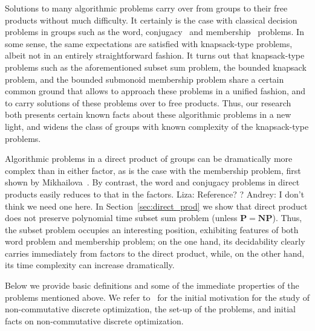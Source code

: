 \documentclass[10pt]{amsart}
\newcommand{\an}{\noindent\color{red} Andrey: }{}
\newcommand{\li}{\noindent\color{blue} Liza: }{}
\theoremstyle{definition}
\def\P{{\mathbf{P}}}
\def\NP{{\mathbf{NP}}}
\begin{document}
Solutions to many algorithmic problems carry over from groups to their free products without much difficulty. It certainly is the case with classical decision problems in groups such as the word, conjugacy~\cite{Lyndon-Schupp:2001} and membership~\cite{Mikhailova_68} problems. In some sense, the same expectations are satisfied with knapsack-type problems, albeit not in an entirely straightforward fashion. It turns out that knapsack-type problems such as the aforementioned subset sum problem, the bounded knapsack problem, and the bounded submonoid membership problem share a certain common ground that allows to approach these problems in a unified fashion, and to carry solutions of these problems over to free products. Thus, our research both presents certain known facts about these algorithmic problems in a new light, and widens the class of groups with known complexity of the knapsack-type problems.

Algorithmic problems in a direct product of groups can be dramatically more complex than in either factor, as is the case with the membership problem, first shown by Mikhailova~\cite{Mikhailova}. By contrast, the word and conjugacy problems in direct products easily reduces to that in the factors. {\li{Reference? \cite{Lyndon-Schupp:2001}?}}  {\an{I don't think we need one here.}}
In Section~\ref{sec:direct_prod} we show that direct product does not preserve polynomial time subset sum problem (unless $\P=\NP$). Thus, the subset problem occupies an interesting position, exhibiting features of both word problem and membership problem; on the one hand, its decidability clearly carries immediately from factors to the direct product, while, on the other hand, its time complexity can increase dramatically. %


Below we provide basic definitions and some of the immediate properties of the problems mentioned above.
We refer to~\cite{Miasnikov-Nikolaev-Ushakov:2014a,Miasnikov-Nikolaev-Ushakov:2014b} for the initial motivation for the study of non-commutative discrete optimization, the set-up of the problems, and initial facts on non-commutative discrete optimization.
\end{document}
